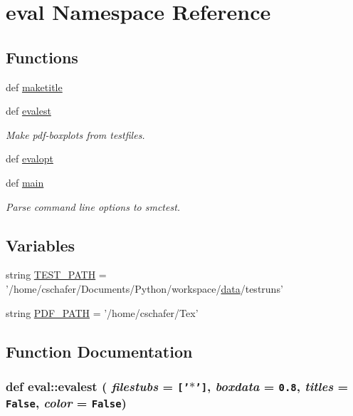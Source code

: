 \hypertarget{namespaceeval}{
\section{eval Namespace Reference}
\label{namespaceeval}
}
\subsection*{Functions}
\begin{CompactItemize}
\item 
def \hyperlink{namespaceeval_2852fcd5af5e95c3f5548a3a51b0c52e}{maketitle}
\item 
def \hyperlink{namespaceeval_c26f3aa5011d54adf5e4c1fbe53a0f54}{evalest}
\begin{CompactList}\small\item\em Make pdf-boxplots from testfiles. \item\end{CompactList}\item 
def \hyperlink{namespaceeval_0dcd0d97820f287e38e356cdf3da3a0c}{evalopt}
\item 
def \hyperlink{namespaceeval_e3b126f2e6d2aa6c1ed96ecf02d91e8d}{main}
\begin{CompactList}\small\item\em Parse command line options to smctest. \item\end{CompactList}\end{CompactItemize}
\subsection*{Variables}
\begin{CompactItemize}
\item 
string \hyperlink{namespaceeval_257985d7d7884932360c75335c8e5052}{TEST\_\-PATH} = '/home/cschafer/Documents/Python/workspace/\hyperlink{classsampling_1_1data}{data}/testruns'
\item 
string \hyperlink{namespaceeval_0f22d22751fdd8f5b825e7484476fe1d}{PDF\_\-PATH} = '/home/cschafer/Tex'
\end{CompactItemize}


\subsection{Function Documentation}
\hypertarget{namespaceeval_c26f3aa5011d54adf5e4c1fbe53a0f54}{
\subsubsection[{evalest}]{\setlength{\rightskip}{0pt plus 5cm}def eval::evalest ( {\em filestubs} = {\tt \mbox{[}'$\ast$'\mbox{]}}, \/   {\em boxdata} = {\tt 0.8}, \/   {\em titles} = {\tt False}, \/   {\em color} = {\tt False})}}
\label{namespaceeval_c26f3aa5011d54adf5e4c1fbe53a0f54}


